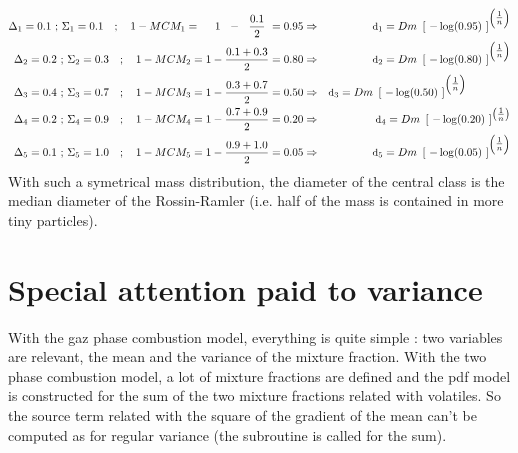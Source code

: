 \begin{eqnarray}
\Delta_{1} = 0.1 \text{ ; } \Sigma_{1} = 0.1 \quad  ; \quad 1-MCM_{1}=~~~~1~~-~~\frac{0.1}{2}~=0.95 &\Rightarrow&
           \mbox{\small d}_1 = Dm ~ \left[~ -\log(0.95) ~\right]^{\left(\textstyle \frac{1}{n}\right)} \nonumber \\
\Delta_{2} = 0.2 \text{ ; } \Sigma_{2} = 0.3 \quad  ; \quad 1-MCM_{2}=1-\frac{0.1+0.3}{2}= 0.80 &\Rightarrow& 
           \mbox{\small d}_2 = Dm ~ \left[~ -\log(0.80) ~\right]^{\left(\textstyle \frac{1}{n}\right)} \nonumber \\
\Delta_{3} = 0.4 \text{ ; } \Sigma_{3} = 0.7 \quad  ; \quad 1-MCM_{3}=1-\frac{0.3+0.7}{2}= 0.50 &\Rightarrow& 
           \mbox{\small d}_3 = Dm ~ \left[~ -\log(0.50) ~\right]^{\left(\textstyle \frac{1}{n}\right)} \qquad \qquad \\
\Delta_{4} = 0.2 \text{ ; } \Sigma_{4} = 0.9 \quad  ; \quad 1-MCM_{4}=1-\frac{0.7+0.9}{2}= 0.20 &\Rightarrow& 
           \mbox{\small d}_4 = Dm ~ \left[~ -\log(0.20) ~\right]^{\textstyle\left( \frac{1}{n}\right)} \nonumber \\
\Delta_{5} = 0.1 \text{ ; } \Sigma_{5} = 1.0 \quad  ; \quad 1-MCM_{5}=1-\frac{0.9+1.0}{2}= 0.05 &\Rightarrow& 
           \mbox{\small d}_5 = Dm ~ \left[~ -\log(0.05) ~\right]^{\left(\textstyle \frac{1}{n}\right)} \nonumber
\end{eqnarray}
With such a symetrical mass distribution, the diameter of the central class is the median diameter of the Rossin-Ramler (i.e. half of the mass is contained in more tiny particles).

\section*{Special attention paid to variance}

With the gaz phase combustion model, everything is quite simple : two variables
are relevant, the mean and the variance of the mixture fraction. With the two
phase combustion model, a lot of mixture fractions are defined and the pdf model
is constructed for the sum of the two mixture fractions related with
volatiles. So the source term related with the square of the gradient of the
mean can't be computed as for regular variance (the  subroutine is
called for the sum).

